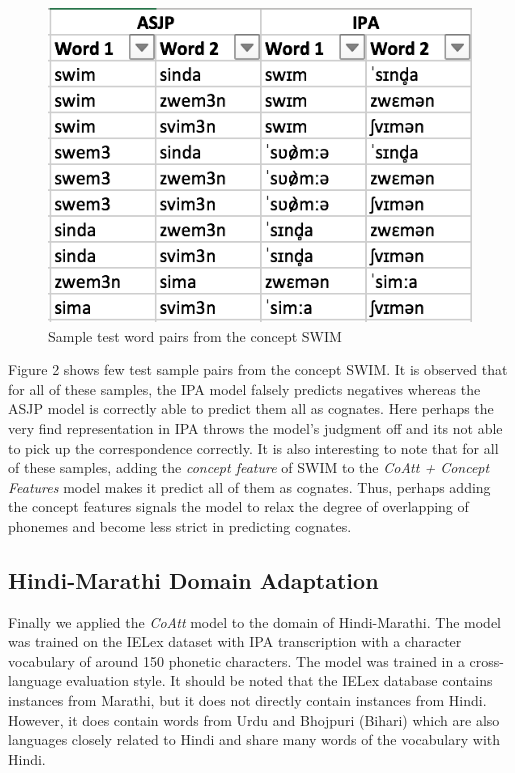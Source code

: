 \documentclass[11pt,letterpaper]{article}
\begin{document}
\begin{figure}[t]
\centering
  \includegraphics[width=.9\linewidth]{swim}
  \caption{Sample test word pairs from the concept SWIM}
  \label{disssim}
\end{figure}

Figure 2 shows few test sample pairs from the concept SWIM. It is observed that for all of these samples, the IPA model falsely predicts negatives whereas the ASJP model is correctly able to predict them all as cognates. Here perhaps the very find representation in IPA throws the model's judgment off and its not able to pick up the correspondence correctly. It is also interesting to note that for all of these samples, adding the \textit{concept feature} of SWIM to the \textit{CoAtt + Concept Features} model makes it predict all of them as cognates. Thus, perhaps adding the concept features signals the model to relax the degree of overlapping of phonemes and become less strict in predicting cognates.

\subsection{Hindi-Marathi Domain Adaptation}

Finally we applied the \textit{CoAtt} model to the domain of Hindi-Marathi. The model was trained on the IELex dataset with IPA transcription with a character vocabulary of around 150 phonetic characters. The model was trained in a cross-language evaluation style. It should be noted that the IELex database contains instances from Marathi, but it does not directly contain instances from Hindi. However, it does contain words from Urdu and Bhojpuri (Bihari) which are also languages closely related to Hindi and share many words of the vocabulary with Hindi.
\end{document}
